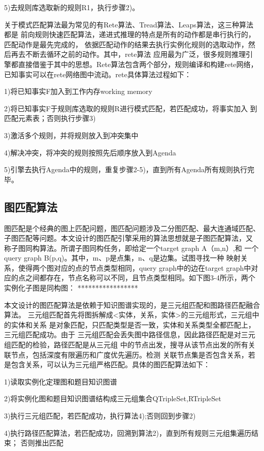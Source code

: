 \documentclass{standalone}
\begin{document}
5)去规则库选取新的规则R1，执行步骤2)。 

关于模式匹配算法最为常见的有Rete算法、Tread算法、Leaps算法，这三种算法都是
前向规则快速匹配算法，递进式推理的特点是所有的动作都是串行执行的，匹配动作是最先完成的，
依据匹配动作的结果去执行实例化规则的选取动作，然后再去不断去循环之前的动作。其中，rete算法
应用最为广泛，很多规则推理引擎都直接借鉴于其中的思想。Rete算法包含两个部分，规则编译和构建rete网络，
已知事实可以在rete网络图中流动。rete具体算法过程如下：

1)将已知事实F加入到工作内存working memory

2)将已知事实F于规则库选取的规则R进行模式匹配，若匹配成功，将事实加入
到匹配元素表；否则执行步骤3)

3)激活多个规则，并将规则放入到冲突集中

4)解决冲突，将冲突的规则按照先后顺序放入到Agenda 

5)引擎去执行Agenda中的规则，重复步骤2-5)，直到所有Agenda所有规则执行完毕。

\subsection{图匹配算法}
图匹配是个经典的图上匹配问题，图匹配问题涉及二分图匹配、最大连通域匹配、
子图匹配等问题。本文设计的图匹配引擎采用的算法思想就是子图匹配算法，又
称子图同构算法。所谓子图同构任务，即给定一个target graph A（m,n）,和
一个query graph B(p,q)。其中，m、p是点集，n、q是边集。试图寻找一种
映射关系，使得两个图对应的点的节点类型相同，query graph中的边在target 
graph中对应的点之间都存在，节点名称可以不同，且节点类型相同。如下图3-4所示，两个
实例化子图是同构图：
*****************

本文设计的图匹配算法是依赖于知识图谱实现的，是三元组匹配和图路径匹配融合算法。
三元组匹配首先将图拆解成<实体，关系，实体>的三元组形式，三元组中的实体和关系
是对象匹配，只匹配类型是否一致，实体和关系类型全都匹配上，三元组匹配成功。由于
三元组匹配会丢失图中路径信息，因此路径匹配是对三元组匹配的检验，路径匹配是从三元组
中的节点出发，搜寻从该节点出发的所有关联节点，包括深度有限遍历和广度优先遍历。检测
关联节点集是否包含关系，若是包含关系，可以认为三元组严格匹配。具体的图匹配算法如下：

1)读取实例化定理图和题目知识图谱

2)将实例化图和题目知识图谱结构成三元组集合QTripleSet,RTripleSet

3)执行三元组匹配，若匹配成功，执行算法4);否则回到步骤2)

4)执行路径匹配算法，若匹配成功，回溯到算法2)，直到所有规则三元组集遍历结束；
否则推出匹配
\end{document}
